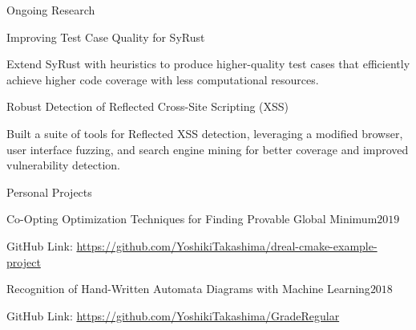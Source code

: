 \documentclass{resume} %
\begin{document}
\begin{rSection}{Ongoing Research}
  \begin{rSubsection}{Improving Test Case Quality for SyRust}{}{}{}
  \item Extend SyRust with heuristics to produce higher-quality test
    cases that efficiently achieve higher code coverage with less
    computational resources.
  \end{rSubsection}
  \begin{rSubsection}{Robust Detection of Reflected Cross-Site
      Scripting (XSS)}{}{}{}
  \item Built a suite of tools for Reflected XSS detection,
    leveraging a modified browser, user interface fuzzing, and search
    engine mining for better coverage and improved vulnerability
    detection.
  \end{rSubsection}
\end{rSection}


\begin{rSection}{Personal Projects}
  \begin{rSubsection}{Co-Opting Optimization Techniques for Finding
      Provable Global Minimum}{$2019$}{}{}
  \item GitHub Link:
    \href{https://github.com/YoshikiTakashima/dreal-cmake-example-project}
    {https://github.com/YoshikiTakashima/dreal-cmake-example-project}
  \end{rSubsection}
  \begin{rSubsection}{Recognition of Hand-Written Automata Diagrams with
      Machine Learning}{$2018$}{}{}
  \item GitHub Link:
    \href{https://github.com/YoshikiTakashima/GradeRegular}
    {https://github.com/YoshikiTakashima/GradeRegular}
  \end{rSubsection}
\end{rSection}
\end{document}
